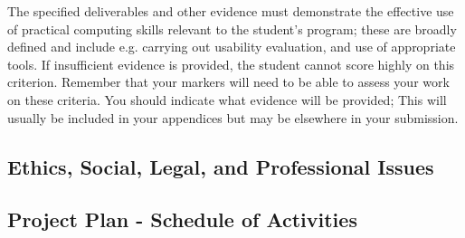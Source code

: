 \documentclass[../CHEFCookingHelperForEveryonesFridge.tex]{subfiles}
\begin{document}
{    The specified deliverables and other evidence must demonstrate the effective use of practical computing skills relevant to the student's program;
    these are broadly defined and include e.g. carrying out usability evaluation, and use of appropriate tools. If insufficient evidence is provided,
    the student cannot score highly on this criterion.
    Remember that your markers will need to be able to assess your work on these criteria. You should indicate what evidence will be provided;
    This will usually be included in your appendices but may be elsewhere in your submission.
}

\subsection{Ethics, Social, Legal, and Professional Issues}


\subsection{Project Plan - Schedule of Activities}


\end{document}
